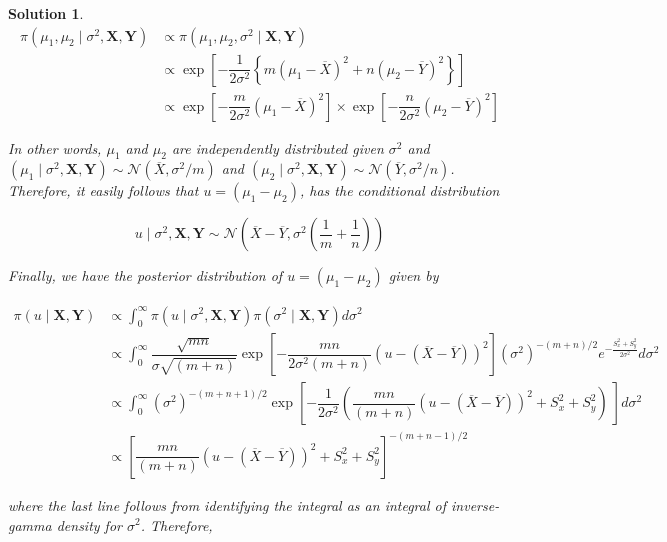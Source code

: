 \documentclass[12pt]{article}
\theoremstyle{problemstyle}
\newtheorem*{solution*}{Solution}
\newcommand{\normal}{\mathcal{N}}
\begin{document}
\begin{solution*}
    \begin{align*}
        \pi(\mu_1, \mu_2 \mid \sigma^2, \boldsymbol{X}, \boldsymbol{Y})
        & \propto \pi(\mu_1, \mu_2, \sigma^2 \mid \boldsymbol{X}, \boldsymbol{Y})\\
        & \propto \exp\left[ -\dfrac{1}{2\sigma^2} \left\{ m(\mu_1 - \overline{X})^2 + n(\mu_2 - \overline{Y})^2 \right\} \right]\\
        & \propto \exp\left[ -\dfrac{m}{2\sigma^2}(\mu_1 - \overline{X})^2 \right] \times \exp\left[ -\dfrac{n}{2\sigma^2}(\mu_2 - \overline{Y})^2 \right]
    \end{align*}

    In other words, $\mu_1$ and $\mu_2$ are independently distributed given $\sigma^2$ and $(\mu_1 \mid \sigma^2, \boldsymbol{X}, \boldsymbol{Y}) \sim \normal(\overline{X}, \sigma^2/m)$ and $(\mu_2 \mid \sigma^2, \boldsymbol{X}, \boldsymbol{Y}) \sim \normal(\overline{Y}, \sigma^2/n)$. Therefore, it easily follows that $u = (\mu_1 - \mu_2)$, has the conditional distribution

    $$
    u \mid \sigma^2, \boldsymbol{X}, \boldsymbol{Y} \sim \normal\left( \overline{X} - \overline{Y}, \sigma^2\left(  \dfrac{1}{m} + \dfrac{1}{n}\right) \right)
    $$

    Finally, we have the posterior distribution of $u = (\mu_1 - \mu_2)$ given by 

    \begin{align*}
        \pi(u \mid \boldsymbol{X}, \boldsymbol{Y})
        & \propto \int_{0}^\infty \pi(u \mid \sigma^2, \boldsymbol{X}, \boldsymbol{Y}) \pi(\sigma^2 \mid \boldsymbol{X}, \boldsymbol{Y}) d\sigma^2\\
        & \propto \int_{0}^\infty \dfrac{\sqrt{mn}}{\sigma \sqrt{(m+n)}} \exp\left[ -\dfrac{mn}{2\sigma^2 (m+n)} (u - (\overline{X} -\overline{Y}) )^2 \right] (\sigma^2)^{-(m+n)/2} e^{-\frac{S_x^2 + S_y^2}{2\sigma^2}} d\sigma^2\\
        & \propto \int_{0}^\infty (\sigma^2)^{-(m+n+1)/2} \exp\left[ -\dfrac{1}{2\sigma^2} \left( \dfrac{mn}{(m+n)}(u - (\overline{X} - \overline{Y}))^2 + S_x^2 + S_y^2 \right) \ \right] d\sigma^2 \\
        & \propto \left[ \dfrac{mn}{(m+n)}(u - (\overline{X} - \overline{Y}))^2 + S_x^2 + S_y^2 \right]^{-(m+n-1)/2}
    \end{align*}

    where the last line follows from identifying the integral as an integral of inverse-gamma density for $\sigma^2$. Therefore, 


\end{solution*}
\end{document}

